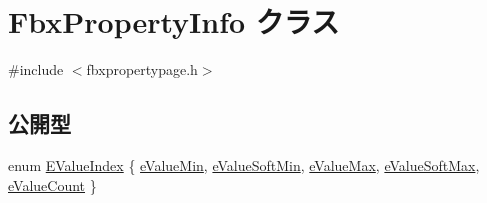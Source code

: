 \hypertarget{class_fbx_property_info}{}\section{Fbx\+Property\+Info クラス}
\label{class_fbx_property_info}


{\ttfamily \#include $<$fbxpropertypage.\+h$>$}

\subsection*{公開型}
\begin{DoxyCompactItemize}
\item 
enum \hyperlink{class_fbx_property_info_a83069f079a29bde133f2e9324de5af43}{E\+Value\+Index} \{ \newline
\hyperlink{class_fbx_property_info_a83069f079a29bde133f2e9324de5af43aefdf1047f9003b7546907981f53e2bb5}{e\+Value\+Min}, 
\hyperlink{class_fbx_property_info_a83069f079a29bde133f2e9324de5af43a3ad0448d525cf35e27b28e981c493bff}{e\+Value\+Soft\+Min}, 
\hyperlink{class_fbx_property_info_a83069f079a29bde133f2e9324de5af43a1e679b76263f004063dd93d5362ca852}{e\+Value\+Max}, 
\hyperlink{class_fbx_property_info_a83069f079a29bde133f2e9324de5af43a1f32310c9bc4251a27744fa563bbbbe9}{e\+Value\+Soft\+Max}, 
\newline
\hyperlink{class_fbx_property_info_a83069f079a29bde133f2e9324de5af43a516868e71d725d328dafc7d3e8d931bd}{e\+Value\+Count}
 \}
\end{DoxyCompactItemize}
